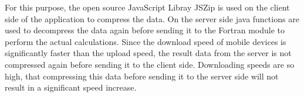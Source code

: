 For this purpose, the open source JavaScript Libray JSZip \cite{jszip} is used on the client side of the application to compress the data. On the server side java functions are used to decompress the data again before sending it to the Fortran module to perform the actual calculations. Since the download speed of mobile devices is significantly faster than the upload speed, the result data from the server is not compressed again before sending it to the client side. Downloading speeds are so high, that compressing this data before sending it to the server side will not result in a significant speed increase.

